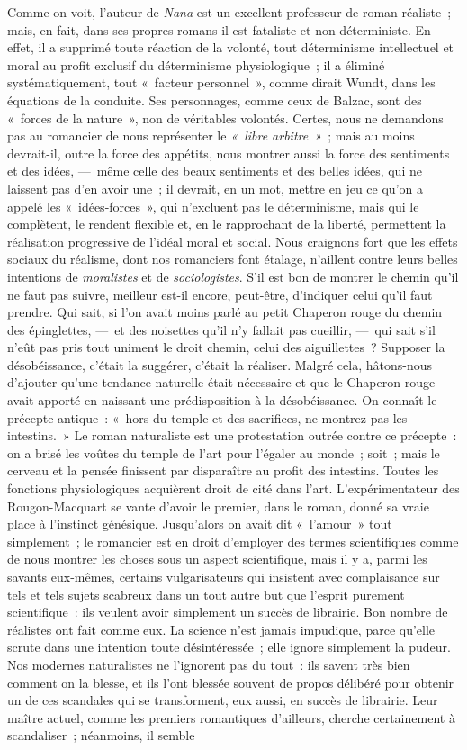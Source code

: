 \documentclass[french,twoside]{book} %
\begin{document}
Comme on voit, l’auteur de \emph{Nana} est un excellent professeur de roman réaliste ; mais, en fait, dans ses propres romans il est fataliste et non déterministe. En effet, il a supprimé toute réaction de la volonté, tout déterminisme intellectuel et moral au profit exclusif du déterminisme physiologique ; il a éliminé systématiquement, tout « facteur personnel », comme dirait Wundt, dans les équations de la conduite. Ses personnages, comme ceux de Balzac, sont des « forces de la nature », non de véritables volontés. Certes, nous ne demandons pas au romancier de nous représenter le \emph{« libre arbitre »} ; mais au moins devrait-il, outre la force des appétits, nous montrer aussi la force des sentiments et des idées, — même celle des beaux sentiments et des belles idées, qui ne laissent pas d’en avoir une ; il devrait, en un mot, mettre en jeu ce qu’on a appelé les « idées-forces », qui n’excluent pas le déterminisme, mais qui le complètent, le rendent flexible et, en le rapprochant de la liberté, permettent la réalisation progressive de l’idéal moral et social. Nous craignons fort que les effets sociaux du réalisme, dont nos romanciers font étalage, n’aillent contre leurs belles intentions de \emph{moralistes} et de \emph{sociologistes}. S’il est bon de montrer le chemin qu’il ne faut pas suivre, meilleur est-il encore, peut-être, d’indiquer celui qu’il faut prendre. Qui sait, si l’on avait moins parlé au petit Chaperon rouge du chemin des épinglettes, — et des noisettes qu’il n’y fallait pas cueillir, — qui sait s’il n’eût pas pris tout uniment le droit chemin, celui des aiguillettes ? Supposer la désobéissance, c’était la suggérer, c’était la réaliser. Malgré cela, hâtons-nous d’ajouter qu’une tendance naturelle était nécessaire et que le Chaperon rouge avait apporté en naissant une prédisposition à la désobéissance. On connaît le précepte antique : « hors du temple et des sacrifices, ne montrez pas les intestins. » Le roman naturaliste est une protestation outrée contre ce précepte : on a brisé les voûtes du temple de l’art pour l’égaler au monde ; soit ; mais le cerveau et la pensée finissent par disparaître au profit des intestins. Toutes les fonctions physiologiques acquièrent droit de cité dans l’art. L’expérimentateur des Rougon-Macquart se vante d’avoir le premier, dans le roman, donné sa vraie place à l’instinct génésique. Jusqu’alors on avait dit « l’amour » tout simplement ; le romancier est en droit d’employer des termes scientifiques comme de nous montrer les choses sous un aspect scientifique, mais il y a, parmi les savants eux-mêmes, certains vulgarisateurs qui insistent avec complaisance sur tels et tels sujets scabreux dans un tout autre but que l’esprit purement scientifique : ils veulent avoir simplement un succès de librairie. Bon nombre de réalistes ont fait comme eux. La science n’est jamais impudique, parce qu’elle scrute dans une intention toute désintéressée ; elle ignore simplement la pudeur. Nos modernes naturalistes ne l’ignorent pas du tout : ils savent très bien comment on la blesse, et ils l’ont blessée souvent de propos délibéré pour obtenir un de ces scandales qui se transforment, eux aussi, en succès de librairie. Leur maître actuel, comme les premiers romantiques d’ailleurs, cherche certainement à scandaliser ; néanmoins, il semble 
\end{document}
